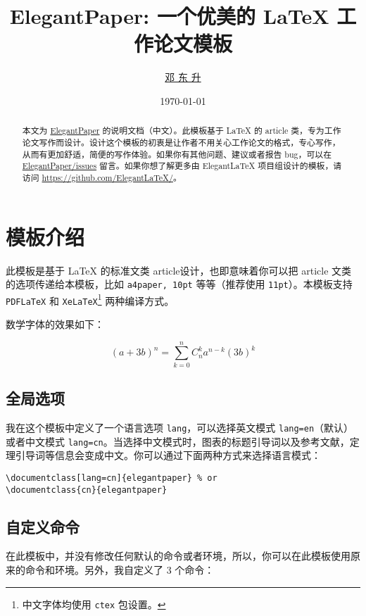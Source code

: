 \documentclass[lang=cn,11pt]{elegantpaper}
\title{ElegantPaper: 一个优美的 \LaTeX{} 工作论文模板}
\author{\href{https://ddswhu.me/}{邓 东 升}}
\institute{\href{https://elegantlatex.org/}{Elegant\LaTeX{} 项目组}}
\date{\today}
\begin{document}
\maketitle

\begin{abstract}
\noindent 本文为 \href{https://github.com/ElegantLaTeX/ElegantPaper/}{ElegantPaper} 的说明文档（中文）。此模板基于 \LaTeX{} 的 article 类，专为工作论文写作而设计。设计这个模板的初衷是让作者不用关心工作论文的格式，专心写作，从而有更加舒适，简便的写作体验。如果你有其他问题、建议或者报告 bug，可以在 \href{https://github.com/ElegantLaTeX/ElegantPaper/issues}{ElegantPaper/issues} 留言。如果你想了解更多由 Elegant\LaTeX{} 项目组设计的模板，请访问 \href{https://github.com/ElegantLaTeX/}{https://github.com/ElegantLaTeX/}。
\end{abstract}


\section{模板介绍}

此模板是基于 \LaTeX{} 的标准文类 article设计，也即意味着你可以把 article 文类的选项传递给本模板，比如 \lstinline{a4paper, 10pt} 等等（推荐使用 \lstinline{11pt}）。本模板支持 \lstinline{PDFLaTeX} 和 \lstinline{XeLaTeX}\footnote{中文字体均使用 \lstinline{ctex} 包设置。} 两种编译方式。

数学字体的效果如下：

\begin{equation}
(a+3b)^{n} = \sum_{k=0}^{n} C_{n}^{k} a^{n-k} (3b)^k\label{eq:binom}
\end{equation}
      
\subsection{全局选项}
我在这个模板中定义了一个语言选项 \lstinline{lang}，可以选择英文模式 \lstinline{lang=en}（默认）或者中文模式 \lstinline{lang=cn}。当选择中文模式时，图表的标题引导词以及参考文献，定理引导词等信息会变成中文。你可以通过下面两种方式来选择语言模式：

\begin{lstlisting}
\documentclass[lang=cn]{elegantpaper} % or
\documentclass{cn}{elegantpaper} 
\end{lstlisting}


\subsection{自定义命令}
在此模板中，并没有修改任何默认的命令或者环境，所以，你可以在此模板使用原来的命令和环境。另外，我自定义了 3 个命令：
\end{document}
